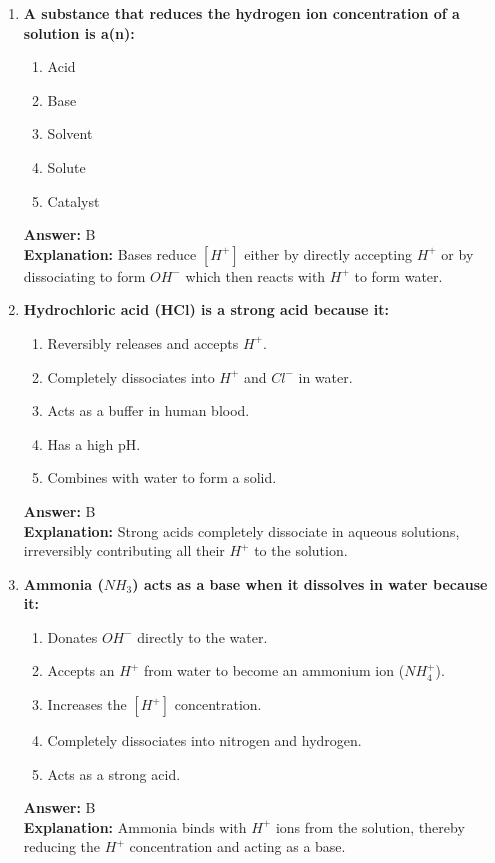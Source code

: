 \documentclass[11pt, a4paper]{article}
\begin{document}
\begin{enumerate}
\item \textbf{A substance that reduces the hydrogen ion concentration of a solution is a(n):}
\begin{enumerate}[label=\Alph*.]
    \item Acid
    \item Base
    \item Solvent
    \item Solute
    \item Catalyst
\end{enumerate}
\textbf{Answer:} B \\
\textbf{Explanation:} Bases reduce $[H^+]$ either by directly accepting $H^+$ or by dissociating to form $OH^-$ which then reacts with $H^+$ to form water.

\item \textbf{Hydrochloric acid (HCl) is a strong acid because it:}
\begin{enumerate}[label=\Alph*.]
    \item Reversibly releases and accepts $H^+$.
    \item Completely dissociates into $H^+$ and $Cl^-$ in water.
    \item Acts as a buffer in human blood.
    \item Has a high pH.
    \item Combines with water to form a solid.
\end{enumerate}
\textbf{Answer:} B \\
\textbf{Explanation:} Strong acids completely dissociate in aqueous solutions, irreversibly contributing all their $H^+$ to the solution.

\item \textbf{Ammonia ($NH_3$) acts as a base when it dissolves in water because it:}
\begin{enumerate}[label=\Alph*.]
    \item Donates $OH^-$ directly to the water.
    \item Accepts an $H^+$ from water to become an ammonium ion ($NH_4^+$).
    \item Increases the $[H^+]$ concentration.
    \item Completely dissociates into nitrogen and hydrogen.
    \item Acts as a strong acid.
\end{enumerate}
\textbf{Answer:} B \\
\textbf{Explanation:} Ammonia binds with $H^+$ ions from the solution, thereby reducing the $H^+$ concentration and acting as a base.


\end{enumerate}
\end{document}
